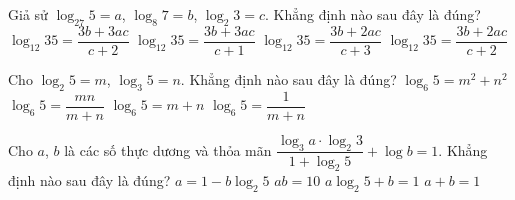 \begin{ex}%
	Giả sử $\log_{27} 5 =  a$, $\log_8 7 = b$, $\log_2 3 = c$. Khẳng định nào sau đây là đúng?
	 \choice
		{ \True $\log_{12} 35=\dfrac{3b + 3ac}{c+2}$  }
		{ $\log_{12} 35=\dfrac{3b + 3ac}{c+1}$  }
		{ $\log_{12} 35=\dfrac{3b  + 2ac}{c+3}$ }
		{ $\log_{12} 35=\dfrac{3b +  2ac}{c+2}$ }
\end{ex}

\begin{ex}%
	Cho $\log_2 5 = m$, $\log_3 5 = n$. Khẳng định nào sau đây là đúng? 
	\choice 
		{  $\log_6 5 = m^2 + n^2$ }
		{ \True $\log_6 5 =\dfrac{mn}{m+n}$ } 
		{  $\log_6 5 =m+n$ }
		{ $\log_6 5 =\dfrac{1}{m+n}$ } 
\end{ex}

\begin{ex}%
	Cho $a$, $b$ là các số thực dương và thỏa mãn $\dfrac{\log_3 a \cdot \log_2 3}{1 + \log_2 5} + \log b = 1$. Khẳng định nào sau đây là  đúng?
	\choice 
		{  $a = 1 - b \log_2 5$ }
		{ \True $ab = 10$  }
		{ $a \log_2 5 + b = 1$  }
		{ $a  + b = 1$ }
\end{ex}

